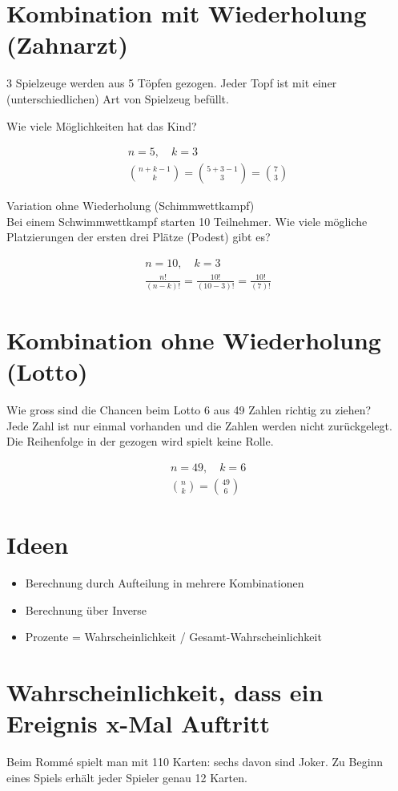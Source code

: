 \documentclass[10pt]{article}
\begin{document}
\section*{Kombination mit Wiederholung (Zahnarzt)}
3 Spielzeuge werden aus 5 Töpfen gezogen. Jeder Topf ist mit einer (unterschiedlichen) Art von Spielzeug befüllt.

Wie viele Möglichkeiten hat das Kind?

$$
\begin{gathered}
n=5, \quad k=3 \\
\binom{n+k-1}{k}=\binom{5+3-1}{3}=\binom{7}{3}
\end{gathered}
$$

Variation ohne Wiederholung (Schimmwettkampf)\\
Bei einem Schwimmwettkampf starten 10 Teilnehmer. Wie viele mögliche Platzierungen der ersten drei Plätze (Podest) gibt es?

$$
\begin{gathered}
n=10, \quad k=3 \\
\frac{n!}{(n-k)!}=\frac{10!}{(10-3)!}=\frac{10!}{(7)!}
\end{gathered}
$$

\section*{Kombination ohne Wiederholung (Lotto)}
Wie gross sind die Chancen beim Lotto 6 aus 49 Zahlen richtig zu ziehen?\\
Jede Zahl ist nur einmal vorhanden und die Zahlen werden nicht zurückgelegt. Die Reihenfolge in der gezogen wird spielt keine Rolle.

$$
\begin{gathered}
n=49, \quad k=6 \\
\binom{n}{k}=\binom{49}{6}
\end{gathered}
$$

\section*{Ideen}
\begin{itemize}
  \item Berechnung durch Aufteilung in mehrere Kombinationen
  \item Berechnung über Inverse
  \item Prozente = Wahrscheinlichkeit / Gesamt-Wahrscheinlichkeit
\end{itemize}

\section*{Wahrscheinlichkeit, dass ein Ereignis x-Mal Auftritt}
Beim Rommé spielt man mit 110 Karten: sechs davon sind Joker. Zu Beginn eines Spiels erhält jeder Spieler genau 12 Karten.
\end{document}
